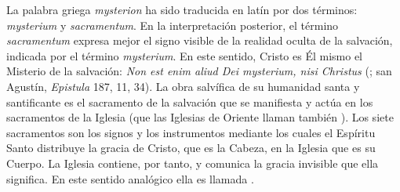 
 La palabra griega \emph{mysterion} ha sido traducida en latín por dos términos: \emph{mysterium} y \emph{sacramentum}. En la interpretación posterior, el término \emph{sacramentum} expresa mejor el signo visible de la realidad oculta de la salvación, indicada por el término \emph{mysterium}. En este sentido, Cristo es Él mismo el Misterio de la salvación: \emph{Non est enim aliud Dei mysterium, nisi Christus} (; san Agustín, \emph{Epistula} 187, 11, 34). La obra salvífica de su humanidad santa y santificante es el sacramento de la salvación que se manifiesta y actúa en los sacramentos de la Iglesia (que las Iglesias de Oriente llaman también ). Los siete sacramentos son los signos y los instrumentos mediante los cuales el Espíritu Santo distribuye la gracia de Cristo, que es la Cabeza, en la Iglesia que es su Cuerpo. La Iglesia contiene, por tanto, y comunica la gracia invisible que ella significa. En este sentido analógico ella es llamada .
